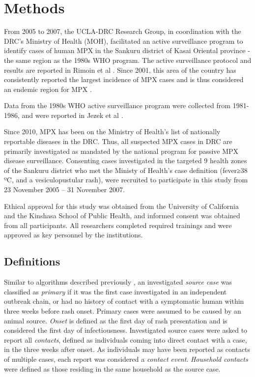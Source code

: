 \section{Methods}

From 2005 to 2007, the UCLA-DRC Research Group, in coordination with the DRC’s Ministry of Health (MOH), facilitated an active surveillance program to identify cases of human MPX in the Sankuru district of Kasai Oriental province - the same region as the 1980s WHO program. The active surveillance protocol and results are reported in Rimoin et al \cite{Rimoin2010}. Since 2001, this area of the country has consistently reported the largest incidence of MPX cases and is thus considered an endemic region for MPX \cite{Rimoin2010}. 

Data from the 1980s WHO active surveillance program were collected from 1981-1986, and were reported in Jezek et al \cite{Jezek1988}.

Since 2010, MPX has been on the Ministry of Health's list of nationally reportable diseases in the DRC. Thus, all suspected MPX cases in DRC are primarily investigated as mandated by the national program for passive MPX disease surveillance. Consenting cases investigated in the targeted 9 health zones of the Sankuru district who met the  Ministy of Health’s case definition (fever≥38 ºC, and a vesiculopustular rash), were recruited to participate in this study from 23 November 2005 – 31 November 2007. 

Ethical approval for this study was obtained from the University of California and the Kinshasa School of Public Health, and informed consent was obtained from all participants. All researchers completed required trainings and were approved as key personnel by the institutions. 

\subsection{Definitions}
Similar to algorithms described previously \cite{Fine1988, Jezek1987, Jezek1988, Dixon2015}, an investigated \textit{source case} was classified as \textit{primary} if it was the first case investigated in an independent outbreak chain, or had no history of contact with a symptomatic human within three weeks before rash onset. Primary cases were assumed to be caused by an animal source. \textit{Onset} is defined as the first day of rash presentation and is considered the first day of infectiousness. Investigated source cases were asked to report all \textit{contacts}, defined as individuals coming into direct contact with a case, in the three weeks after onset. As individuals may have been reported as contacts of multiple cases, each report was considered a \textit{contact event}. \textit{Household contacts} were defined as those residing in the same household as the source case.

